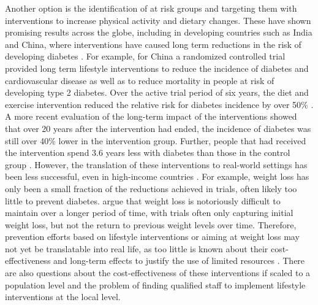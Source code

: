 Another option is the identification of at risk groups and targeting them with interventions to increase physical activity and dietary changes. These have shown promising results across the globe, including in developing countries such as India and China, where interventions have caused long term reductions in the risk of developing diabetes \parencite{Cefalu2016}. For example, for China a randomized controlled trial provided long term lifestyle interventions to reduce the incidence of diabetes and cardiovascular disease as well as to reduce mortality in people at risk of developing type 2 diabetes. Over the active trial period of six years, the diet and exercise intervention reduced the relative risk for diabetes incidence by  over 50\% \parencite{Pan1997}. A more recent evaluation of the long-term impact of the interventions showed that over 20 years after the intervention had ended, the incidence of diabetes was still over 40\% lower in the intervention group. Further, people that had received the intervention spend 3.6 years less with diabetes than those in the control group \parencite{Li2008}. However, the translation of these interventions to real-world settings has been less successful, even in high-income countries \parencite{Wareham2016, Kahn2014}. For example, weight loss has only been a small fraction of the reductions achieved in trials, often likely too little to prevent diabetes. \textcite{Kahn2014} argue that weight loss is notoriously difficult to maintain over a longer period of time, with trials often only capturing initial weight loss, but not the return to previous weight levels over time.  Therefore, prevention efforts based on lifestyle interventions or aiming at weight loss may not yet be translatable into real life, as too little is known about their cost-effectiveness and long-term effects to justify the use of limited resources \parencite{Kahn2014}. There are also questions about the cost-effectiveness of these interventions if scaled to a population level and the problem of finding qualified staff to implement lifestyle interventions at the local level. 

